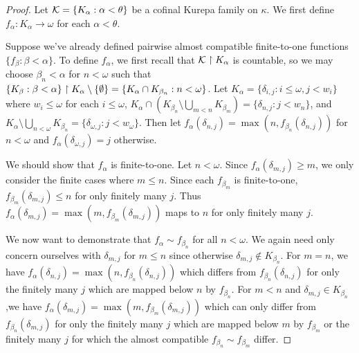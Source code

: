 \documentclass{amsart}
\theoremstyle{plain}
\theoremstyle{definition}
\theoremstyle{remark}
\theoremstyle{plain}
\theoremstyle{definition}
\theoremstyle{remark}
\begin{document}
  \begin{proof}
    Let \(\mathcal{K}=\{K_\alpha:\alpha<\theta\}\)
    be a cofinal Kurepa family on \(\kappa\).
    We first define \(f_\alpha:K_\alpha\to\omega\) for each \(\alpha<\theta\).

    Suppose we've already defined pairwise almost compatible finite-to-one functions
    \(\{f_\beta:\beta<\alpha\}\). To define
    \(f_\alpha\), we first recall that \(\mathcal{K}\restriction K_\alpha\) is countable,
    so we may choose \(\beta_n<\alpha\) for \(n<\omega\) such that
    \(
      \{K_\beta:\beta<\alpha\}\restriction K_\alpha \setminus \{\emptyset\}
        =
      \{K_\alpha\cap K_{\beta_n}:n<\omega\}
    \).
    Let \(K_\alpha=\{\delta_{i,j}:i\leq\omega,j<w_i\}\) where
    \(w_i\leq\omega\) for each \(i\leq\omega\),
    \(
      K_\alpha\cap \left(K_{\beta_n}\setminus\bigcup_{m<n}K_{\beta_m}\right)
        =
      \{\delta_{n,j}:j<w_n\}
    \),
    and
    \(
      K_\alpha\setminus\bigcup_{n<\omega}K_{\beta_n}
        =
      \{
        \delta_{\omega,j}:j<w_\omega
      \}
    \).
    Then let \(f_\alpha(\delta_{n,j})=\max(n,f_{\beta_n}(\delta_{n,j}))\) for
    \(n<\omega\) and \(f_\alpha(\delta_{\omega,j})=j\) otherwise.

    We should show that \(f_\alpha\) is finite-to-one. Let \(n<\omega\).
    Since \(f_\alpha(\delta_{m,j})\geq m\), we only consider the finite cases
    where \(m\leq n\). Since each
    \(f_{\beta_m}\) is finite-to-one, \(f_{\beta_m}(\delta_{m,j})\leq n\)
    for only finitely many \(j\). Thus
    \(f_\alpha(\delta_{m,j})=\max(m,f_{\beta_m}(\delta_{m,j}))\) maps to
    \(n\) for only finitely many \(j\).

    We now want to demonstrate that \(f_\alpha\sim f_{\beta_n}\) for all
    \(n<\omega\). We again need only concern ourselves with \(\delta_{m,j}\) for
    \(m\leq n\) since otherwise \(\delta_{m,j}\not\in K_{\beta_n}\).
    For \(m=n\), we have
    \(f_\alpha(\delta_{n,j})=\max(n,f_{\beta_n}(\delta_{n,j}))\) which differs
    from \(f_{\beta_n}(\delta_{n,j})\) for only the finitely many \(j\) which
    are mapped below \(n\) by \(f_{\beta_n}\).
    For \(m<n\) and \(\delta_{m,j}\in K_{\beta_n}\),we have
    \(f_\alpha(\delta_{m,j})=\max(m,f_{\beta_m}(\delta_{m,j}))\) which can
    only differ
    from \(f_{\beta_n}(\delta_{m,j})\) for only the finitely many \(j\) which
    are mapped below \(m\) by \(f_{\beta_m}\) or the finitely many \(j\)
    for which the
    almost compatible \(f_{\beta_n}\sim f_{\beta_m}\) differ.
  \end{proof}
\end{document}
